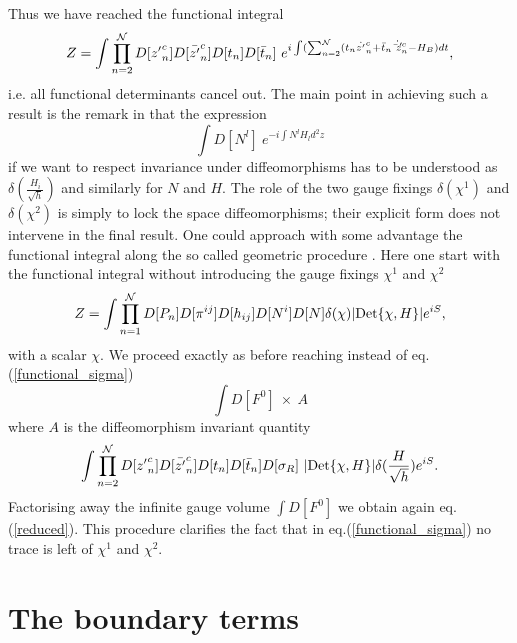 \documentclass[a4paper,12pt]{article}
\begin{document}
Thus we have reached the functional integral
\begin{equation}\label{reduced}
Z=\int \prod_{n=2}^{\cal N}D[{z'}^c_n]D[\bar{ z'}^c_n]D[t_n]D[\bar
t_n]~e^{i\int (\sum_{n=2}^{\cal N}( t_n\dot {z'}^c_n +
\bar t_n \dot{\bar z'}^c_n- H_B)dt}, 
\end{equation}
i.e. all functional determinants cancel out. The main point in
achieving such a result 
is the remark in \cite{carlip} that the expression
\begin{equation}
\int D[N^l]~e^{-i\int N^lH_l d^2z} 
\end{equation}
if we want to respect invariance under diffeomorphisms has to be
understood as
$
\displaystyle{\delta(\frac{H_i}{\sqrt h})}
$
and similarly for $N$ and $H$.
The role of the two gauge fixings $\delta(\chi^1)$ and
$\delta(\chi^2)$ is simply to lock the space diffeomorphisms; their
explicit form does not intervene in the final result. One could
approach with some advantage the functional integral along the so
called geometric procedure \cite{alvarez,polchinski,mottola}. Here one
start with the 
functional integral without introducing the gauge fixings $\chi^1$ and
$\chi^2$
\begin{equation}
Z= \int \prod_{n=1}^{\mathcal{N}}D[P_n]
D[\pi^{ij}] D[h_{ij}] D[N^i] D[N] \delta(\chi)
|{\rm Det}\{\chi, H\}| e^{i S},
\end{equation}
with a scalar $\chi$. We proceed exactly as before reaching instead of
eq.(\ref{functional_sigma})
\begin{equation}
\int D[F^0]~\times~A
\end{equation}
where $A$ is the diffeomorphism invariant quantity 
\begin{equation} 
\int \prod_{n=2}^{\cal N}D[{z'}^c_n]D[\bar{z'}^c_n]D[t_n]D[\bar
t_n] D[\sigma_R]~|{\rm Det}\{\chi, H\}| \delta(\frac{H}{\sqrt{h}}) 
e^{i S}.
\end{equation}
Factorising away the infinite gauge volume $\int D[F^0]$ we obtain
again eq.(\ref{reduced}). This procedure clarifies the fact that in
eq.(\ref{functional_sigma}) no trace is left of $\chi^1$ and
$\chi^2$.





\section{The boundary terms}
\end{document}
